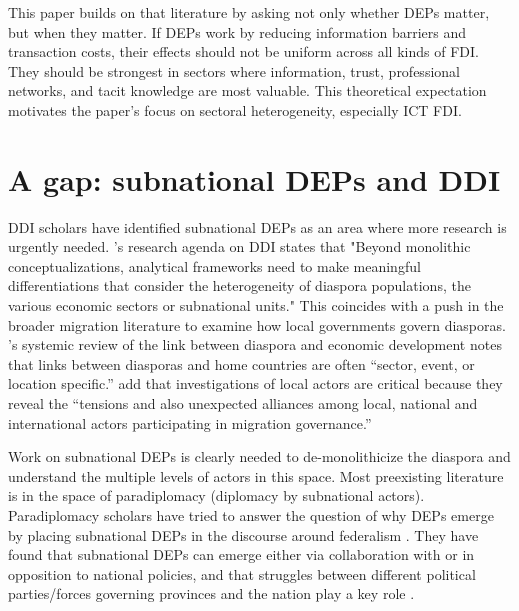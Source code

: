 \documentclass[doublespace,nopageskip]{UVAthesis}
\begin{document}
This paper builds on that literature by asking not only whether DEPs matter, but when they matter. If DEPs work by reducing information barriers and transaction costs, their effects should not be uniform across all kinds of FDI. They should be strongest in sectors where information, trust, professional networks, and tacit knowledge are most valuable. This theoretical expectation motivates the paper's focus on sectoral heterogeneity, especially ICT FDI.

\section{A gap: subnational DEPs and DDI} \label{ss:subnational deps and ddi}

DDI scholars have identified subnational DEPs as an area where more research is urgently needed. \citet{naujoks_transnational_2022}'s research agenda on DDI states that "Beyond monolithic conceptualizations, analytical frameworks need to make meaningful differentiations that consider the heterogeneity of diaspora populations, the various economic sectors or subnational units." This coincides with a push in the broader migration literature to examine how local governments govern diasporas. \citet{gevorkyan_diaspora_2022}'s systemic review of the link between diaspora and economic development notes that links between diasporas and home countries are often ``sector, event, or location specific.'' \citet{gazzotti_embracing_2023} add that investigations of local actors are critical because they reveal the ``tensions and also unexpected alliances among local, national and international actors participating in migration governance.''

Work on subnational DEPs is clearly needed to de-monolithicize the diaspora and understand the multiple levels of actors in this space. Most preexisting literature is in the space of paradiplomacy (diplomacy by subnational actors). Paradiplomacy scholars have tried to answer the question of why DEPs emerge by placing subnational DEPs in the discourse around federalism \citep{liu_chinese_2020}. They have found that subnational DEPs can emerge either via collaboration with or in opposition to national policies, and that struggles between different political parties/forces governing provinces and the nation play a key role \citep{sharma_partisan_2020}.
\end{document}
